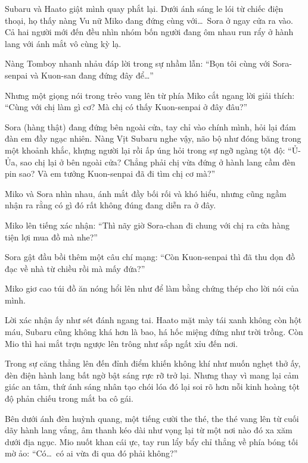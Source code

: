 \documentclass[../main.tex]{subfiles}
\begin{document}
Subaru và Haato giật mình quay phắt lại. Dưới ánh sáng le lói từ chiếc điện thoại, họ thấy nàng Vu nữ Miko đang đứng cùng với\dots\ Sora ở ngay cửa ra vào. Cả hai người mới đến đều nhìn nhóm bốn người đang ôm nhau run rẩy ở hành lang với ánh mắt vô cùng kỳ lạ.

Nàng Tomboy nhanh nhảu đáp lời trong sự nhầm lẫn: ``Bọn tôi cùng với Sora-senpai và Kuon-san đang đứng đây để\dots''


Nhưng một giọng nói trong trẻo vang lên từ phía Miko cắt ngang lời giải thích: ``Cùng với chị làm gì cơ? Mà chị có thấy Kuon-senpai ở đây đâu?''

Sora (hàng thật) đang đứng bên ngoài cửa, tay chỉ vào chính mình, hỏi lại đám đàn em đầy ngạc nhiên. Nàng Vịt Subaru nghe vậy, não bộ như đóng băng trong một khoảnh khắc, khựng người lại rồi ấp úng hỏi trong sự ngỡ ngàng tột độ: ``Ủ-Ủa, sao chị lại ở bên ngoài cửa? Chẳng phải chị vừa đứng ở hành lang cầm đèn pin sao? Và em tưởng Kuon-senpai đã đi tìm chị cơ mà?''

Miko và Sora nhìn nhau, ánh mắt đầy bối rối và khó hiểu, nhưng cũng ngầm nhận ra rằng có gì đó rất không đúng đang diễn ra ở đây.

Miko lên tiếng xác nhận: ``Thì nãy giờ Sora-chan đi chung với chị ra cửa hàng tiện lợi mua đồ mà nhe?''

Sora gật đầu bồi thêm một câu chí mạng: ``Còn Kuon-senpai thì đã thu dọn đồ đạc về nhà từ chiều rồi mà mấy đứa?''


Miko giơ cao túi đồ ăn nóng hổi lên như để làm bằng chứng thép cho lời nói của mình.

Lời xác nhận ấy như sét đánh ngang tai. Haato mặt mày tái xanh không còn hột máu, Subaru cũng không khá hơn là bao, há hốc miệng đứng như trời trồng. Còn Mio thì hai mắt trợn ngược lên trông như sắp ngất xỉu đến nơi.

Trong sự căng thẳng lên đến đỉnh điểm khiến không khí như muốn nghẹt thở ấy, đèn điện hành lang bất ngờ bật sáng rực rỡ trở lại. Nhưng thay vì mang lại cảm giác an tâm, thứ ánh sáng nhân tạo chói lóa đó lại soi rõ hơn nỗi kinh hoàng tột độ phản chiếu trong mắt ba cô gái.

\omk

Bên dưới ánh đèn huỳnh quang, một tiếng cười the thé, the thé vang lên từ cuối dãy hành lang vắng, âm thanh kéo dài như vọng lại từ một nơi nào đó xa xăm dưới địa ngục. Mio nuốt khan cái ực, tay run lẩy bẩy chỉ thẳng về phía bóng tối mờ ảo: ``Có\dots\ có ai vừa đi qua đó phải không?''
\end{document}
